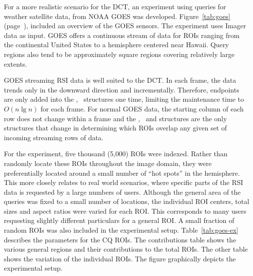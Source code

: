 \documentclass{ucdthesis}       %
\begin{document}
For a more realistic scenario for the \ac{DCT}, an experiment using
queries for weather satellite data, from \ac{NOAA} \ac{GOES} was
developed.  Figure~\ref{tab:goes} (page~\pageref{tab:goes}), included
an overview of the \ac{GOES} sensors.  The experiment uses Imager data
as input.  \ac{GOES} offers a continuous stream of data for \acp{ROI}
ranging from the continental United States to a hemisphere centered
near Hawaii.  Query regions also tend to be approximately square
regions covering relatively large extents.

\ac{GOES} streaming \ac{RSI} data is well suited to the \ac{DCT}.  In each
frame, the data trends only in the downward direction and
incrementally.  Therefore, endpoints are only added into the \Xn, \Xx\ 
structures one time, limiting the maintenance time to $O(n\lg{n})$ for
each frame.  For normal \ac{GOES} data, the starting column of each
row does not change within a frame and the \Yn, \Yx\ and \id{A} 
structures are the only structures that change in determining which
\acp{ROI} overlap any given set of incoming streaming rows of data.

For the experiment, five thousand (5,000) \acp{ROI} were indexed.
Rather than randomly locate these \acp{ROI} throughout the image domain,
they were preferentially located around a small number of ``hot
spots'' in the hemisphere.  This more closely relates to real world
scenarios, where specific parts of the \ac{RSI} data is requested by
a large numbers of users.  Although the general area of the queries
was fixed to a small number of locations, the individual \ac{ROI}
centers, total sizes and aspect ratios were varied for each \ac{ROI}.
This corresponds to many users requesting slightly different
particulars for a general \ac{ROI}.  A small fraction of
random \acp{ROI} was also included in the experimental setup.
Table~\ref{tab:goes-ex} describes the parameters for the \ac{CQ}
\acp{ROI}.  The contributions table shows the various general regions
and their contributions to the total \acp{ROI}.  The other table shows
the variation of the individual \acp{ROI}.  The figure graphically
depicts the experimental setup.
\end{document}
